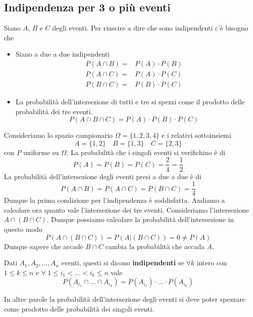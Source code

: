 \subsection{Indipendenza per 3 o più eventi}
Siano $A$, $B$ e $C$ degli eventi. Per riuscire a dire che sono indipendenti c'è bisogno che
\begin{itemize}
	\item Siano a due a due indipendenti
	      \begin{align*}
		      P(A \cap B) = & P(A) \cdot P(B) \\
		      P(A \cap C) = & P(A) \cdot P(C) \\
		      P(B \cap C) = & P(B) \cdot P(C)
	      \end{align*}
	\item La probabilità dell'intersezione di tutti e tre si spezzi come il prodotto delle
	      probabilità dei tre eventi.
	      \[ P(A \cap B \cap C) = P(A) \cdot P(B) \cdot P(C) \]
\end{itemize}

\begin{example}
	Consideriamo lo spazio campionario $\Omega=\{ 1,2,3,4 \}$ e i relativi sottoinsiemi
	\[ A=\{ 1, 2 \} \quad B=\{ 1, 3 \} \quad C=\{ 2, 3 \} \]
	con $P$ uniforme su $\Omega$. La probabilità che i singoli eventi si verifichino è di
	\[ P(A) = P(B) = P(C) = \frac{2}{4} = \frac{1}{2} \]
	La probabilità dell'intersezione degli eventi presi a due a due è di
	\[ P(A \cap B) = P(A \cap C) = P(B \cap C) = \frac{1}{4} \]
	Dunque la prima condizione per l'indipendenza è soddisfatta. Andiamo a calcolare ora quanto
	vale l'intersezione dei tre eventi. Consideriamo l'intersezione $A \cap (B \cap C)$. Dunque
	possiamo calcolare la probabilità dell'intersezione in questo modo
	\[ P(A \cap (B \cap C)) = P(A | (B \cap C)) = 0 \neq P(A) \]
	Dunque sapere che accade $B \cap C$ cambia la probabilità che accada $A$.
\end{example}

\begin{definition}
	Dati $A_1, A_2, \dots, A_n$ eventi, questi si dicono \textbf{indipendenti} se $\forall k$
	intero con $1 \leq k \leq n$ e $\forall \; 1 \leq i_1 < \dots < i_k \leq n$ vale
	\[ P(A_{i_1} \cap \dots \cap A_{i_k}) = P(A_{i_1}) \cdot \dots \cdot P(A_{i_k}) \]
\end{definition}

In altre parole la probabilità dell'intersezione degli eventi si deve poter spezzare come
prodotto delle probabilità dei singoli eventi.

